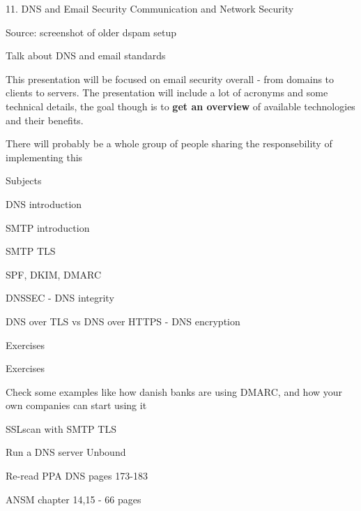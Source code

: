 \documentclass[Screen16to9,17pt]{foils}
\begin{document}

\mytitlepage
{11. DNS and Email Security}
{Communication and Network Security \the\year}



Source: screenshot of older dspam setup

\begin{list2}
\item Talk about DNS and email standards
\item This presentation will be focused on email security overall - from domains to clients to servers. The presentation will include a lot of acronyms and some technical details, the goal though is to {\bf get an overview} of available technologies and their benefits.
\item There will probably be a whole group of people sharing the responsebility of implementing this
\end{list2}






\begin{list1}
\item Subjects
\begin{list2}
\item DNS introduction
\item SMTP introduction
\item SMTP TLS
\item SPF, DKIM, DMARC
\item DNSSEC - DNS integrity
\item DNS over TLS vs DNS over HTTPS - DNS encryption

Exercises
\end{list2}
\item Exercises
\begin{list2}
\item Check some examples like how danish banks are using DMARC, and how your own companies can start using it
\item SSLscan with SMTP TLS
\item Run a DNS server Unbound
\end{list2}
\end{list1}



\begin{list1}
\item Re-read PPA DNS pages 173-183
\item {}
\item {}
\item {}
\item ANSM chapter 14,15 - 66 pages
\end{list1}
\end{document}
